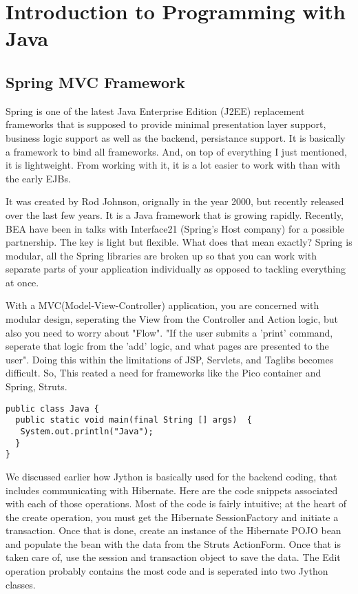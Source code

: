 \chapter{ Introduction to Programming with Java }

\section{Spring MVC Framework}

Spring is one of the latest Java Enterprise Edition (J2EE) replacement 
frameworks that is supposed to provide minimal presentation layer support, 
business logic support as well as the backend, persistance support. 
It is basically a framework to bind all frameworks. And, on top 
of everything I just mentioned, it is lightweight. 
From working with it, it is a lot easier to work with than with the early EJBs.

It was created by Rod Johnson, orignally in the year 2000, but recently released over the last few years.
It is a Java framework that is growing rapidly. Recently, BEA have been in talks with
Interface21 (Spring's Host company) for a possible partnership. The key is light but flexible. What does
that mean exactly? Spring is modular, all the Spring libraries are broken up so that you can work with
separate parts of your application individually as opposed to tackling everything at once.

With a MVC(Model-View-Controller) application, you are concerned with modular design,
seperating the View from the Controller and Action logic, but also you need to worry about "Flow". "If
the user submits a 'print' command, seperate that logic from the 'add' logic, and what pages are
presented to the user". Doing this within the limitations of JSP, Servlets, and Taglibs becomes difficult.
So, This reated a need for frameworks like the Pico container and Spring, Struts. 

\begin{lstlisting}
public class Java {
  public static void main(final String [] args)  {
   System.out.println("Java");
  }
}
\end{lstlisting}

We discussed earlier how Jython is basically used for the backend 
coding, that includes communicating with Hibernate. 
Here are the code snippets associated with each of those operations. 
Most of the code is fairly intuitive; at the heart of the 
create operation, you must get the Hibernate SessionFactory 
and initiate a transaction. Once that is done, 
create an instance of the Hibernate POJO bean and populate 
the bean with the data from the Struts ActionForm. 
Once that is taken care of, use the session and transaction 
object to save the data. The Edit operation probably contains 
the most code and is seperated into two Jython classes.


